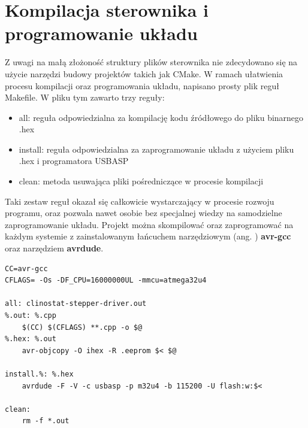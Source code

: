 \section{Kompilacja sterownika i programowanie układu}

Z uwagi na małą złożoność struktury plików sterownika nie zdecydowano się na użycie narzędzi budowy projektów takich jak CMake. W ramach ułatwienia procesu kompilacji oraz programowania układu, napisano prosty plik reguł Makefile. W pliku tym zawarto trzy reguły:
\begin{itemize}
	\item all: reguła odpowiedzialna za kompilację kodu źródłowego do pliku binarnego .hex
	\item install: reguła odpowiedzialna za zaprogramowanie układu z użyciem pliku .hex i programatora USBASP
	\item clean: metoda usuwająca pliki pośredniczące w procesie kompilacji
\end{itemize}
Taki zestaw reguł okazał się całkowicie wystarczający w procesie rozwoju programu, oraz pozwala nawet osobie bez specjalnej wiedzy na samodzielne zaprogramowanie układu. Projekt można skompilować oraz zaprogramować na każdym systemie z zainstalowanym łańcuchem narzędziowym (ang. ) \textbf{avr-gcc} oraz narzędziem \textbf{avrdude}.

\begin{lstlisting}[caption=Makefile sterownika]
CC=avr-gcc
CFLAGS= -Os -DF_CPU=16000000UL -mmcu=atmega32u4

all: clinostat-stepper-driver.out
%.out: %.cpp
	$(CC) $(CFLAGS) **.cpp -o $@
%.hex: %.out
	avr-objcopy -O ihex -R .eeprom $< $@

install.%: %.hex
	avrdude -F -V -c usbasp -p m32u4 -b 115200 -U flash:w:$<

clean:
	rm -f *.out
\end{lstlisting}